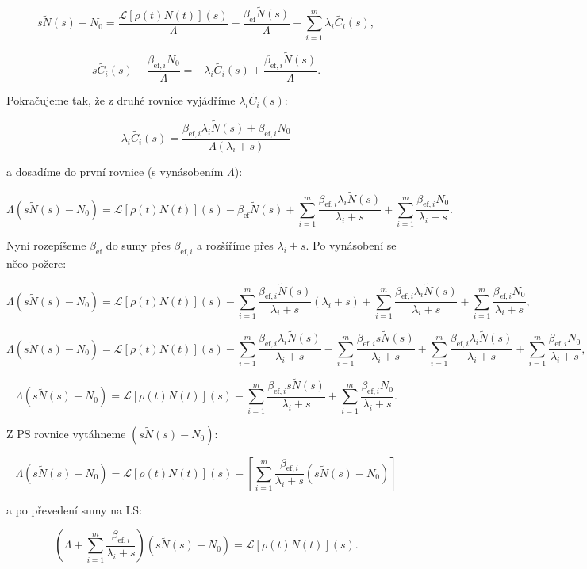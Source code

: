 $$ s \tilde{N}(s) - N_0 = \dfrac{\mathcal{L}[\rho(t) N(t)](s)}{\Lambda} - \dfrac{\beta_{\text{ef}} \tilde{N}(s)}{\Lambda} + \sum_{i=1}^m \lambda_i \tilde{C_i}(s), $$

$$ s \tilde{C_i}(s) - \dfrac{\beta_{\text{ef},i}  N_0}{\Lambda} = -\lambda_i \tilde{C_i}(s) + \dfrac{\beta_{\text{ef},i}  \tilde{N}(s)}{\Lambda}. $$

Pokračujeme tak, že z druhé rovnice vyjádříme $\lambda_i \tilde{C_i}(s)$:

$$ \lambda_i \tilde{C_i}(s) = \dfrac{\beta_{\text{ef},i} \lambda_i \tilde{N}(s) + \beta_{\text{ef},i}N_0}{\Lambda(\lambda_i + s)} $$

a dosadíme do první rovnice (s vynásobením $\Lambda$):

$$ \Lambda (s \tilde{N}(s) - N_0) = \mathcal{L}[\rho(t) N(t)](s) - \beta_{\text{ef}} \tilde{N}(s) + \sum_{i=1}^m \dfrac{\beta_{\text{ef},i} \lambda_i \tilde{N}(s)}{\lambda_i + s} + \sum_{i=1}^m \dfrac{\beta_{\text{ef},i}N_0}{\lambda_i + s}. $$

Nyní rozepíšeme $\beta_{\text{ef}}$ do sumy přes $\beta_{\text{ef},i}$ a rozšíříme přes $\lambda_i + s$. Po vynásobení se něco požere:

$$ \Lambda (s \tilde{N}(s) - N_0) = \mathcal{L}[\rho(t) N(t)](s) - \sum_{i=1}^m \dfrac{\beta_{\text{ef},i} \tilde{N}(s)}{\lambda_i + s}(\lambda_i + s) + \sum_{i=1}^m \dfrac{\beta_{\text{ef},i} \lambda_i \tilde{N}(s)}{\lambda_i + s} + \sum_{i=1}^m \dfrac{\beta_{\text{ef},i}N_0}{\lambda_i + s}, $$

$$ \Lambda (s \tilde{N}(s) - N_0) = \mathcal{L}[\rho(t) N(t)](s) - \sum_{i=1}^m \dfrac{\beta_{\text{ef},i} \lambda_i \tilde{N}(s)}{\lambda_i + s} - \sum_{i=1}^m \dfrac{\beta_{\text{ef},i} s \tilde{N}(s)}{\lambda_i + s} + \sum_{i=1}^m \dfrac{\beta_{\text{ef},i} \lambda_i \tilde{N}(s)}{\lambda_i + s} + \sum_{i=1}^m \dfrac{\beta_{\text{ef},i}N_0}{\lambda_i + s}, $$

$$ \Lambda (s \tilde{N}(s) - N_0) = \mathcal{L}[\rho(t) N(t)](s) - \sum_{i=1}^m \dfrac{\beta_{\text{ef},i} s \tilde{N}(s)}{\lambda_i + s} + \sum_{i=1}^m \dfrac{\beta_{\text{ef},i}N_0}{\lambda_i + s}. $$

Z PS rovnice vytáhneme $(s \tilde{N}(s) - N_0)$:

$$ \Lambda (s \tilde{N}(s) - N_0) = \mathcal{L}[\rho(t) N(t)](s) - \left [ \sum_{i=1}^m \dfrac{\beta_{\text{ef},i}}{\lambda_i + s}(s \tilde{N}(s) - N_0) \right ]$$

a po převedení sumy na LS:

$$ \left ( \Lambda + \sum_{i=1}^m \dfrac{\beta_{\text{ef},i}}{\lambda_i + s} \right ) (s \tilde{N}(s) - N_0) = \mathcal{L}[\rho(t) N(t)](s). $$

